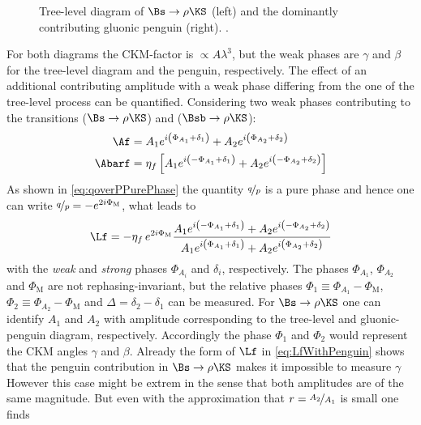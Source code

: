 \begin{figure}[tbp]
	\centering
	
	
	\caption{Tree-level diagram of $\Bs\to\rho\KS$ (left) and the dominantly contributing gluonic penguin (right). \cite{Ellis:2016jkw}.}
	\label{fig:Bs2RhoKS}
\end{figure}
For both diagrams the CKM-factor is $\propto A\lambda^3$, but the weak phases are $\gamma$ and $\beta$ for the tree-level diagram and the penguin, respectively.
The effect of an additional contributing amplitude with a weak phase differing from the one of the tree-level process can be quantified.
Considering two weak phases contributing to the transitions \Af ($\Bs\to\rho\KS$) and \Abarf ($\Bsb\to\rho\KS$):
\begin{equation}
\begin{aligned}
\Af&=A_1e^{i\left(\Phi_{A_1}+\delta_1\right)}+A_2e^{i\left(\Phi_{A_2}+\delta_2\right)}\\
\Abarf&=\eta_f\left[A_1e^{i\left(-\Phi_{A_1}+\delta_1\right)}+A_2e^{i\left(-\Phi_{A_2}+\delta_2\right)}\right]
\end{aligned}
\end{equation}
As shown in \cref{eq:qoverPPurePhase} the quantity $\nicefrac{q}{p}$ is a pure phase and hence one can write $\nicefrac{q}{p}=-e^{2i\Phi_\text{M}}$, what leads to
\begin{equation}
\Lf=-\eta_f\,e^{2i\Phi_\text{M}}\frac{ A_1 e^{i\left(-\Phi_{A_1}+\delta_1\right)} + A_2 e^{i\left(-\Phi_{A_2}+\delta_2\right)}}{A_1e^{i\left(\Phi_{A_1}+\delta_1\right)}+A_2e^{i\left(\Phi_{A_2}+\delta_2\right)}} \label{eq:LfWithPenguin}
\end{equation}
with the \emph{weak} and \emph{strong} phases $\Phi_{A_i}$ and $\delta_i$, respectively.
The phases $\Phi_{A_1}$, $\Phi_{A_2}$ and $\Phi_\text{M}$ are not rephasing-invariant, but the relative phases $\Phi_1\equiv\Phi_{A_1}-\Phi_\text{M}$, $\Phi_2\equiv\Phi_{A_2}-\Phi_\text{M}$ and $\Delta=\delta_2-\delta_1$ can be measured.
For $\Bs\to\rho\KS$ one can \eg identify $A_1$ and $A_2$ with amplitude corresponding to the tree-level and gluonic-penguin diagram, respectively.
Accordingly the phase $\Phi_1$ and $\Phi_2$ would represent the CKM angles $\gamma$ and $\beta$.
Already the form of $\Lf$ in \cref{eq:LfWithPenguin} shows that the penguin contribution in $\Bs\to\rho\KS$ makes it impossible to measure $\gamma$
However this case might be extrem in the sense that both amplitudes are of the same magnitude.
But even with the approximation that $r=\nicefrac{A_2}{A_1}$ is small one finds
